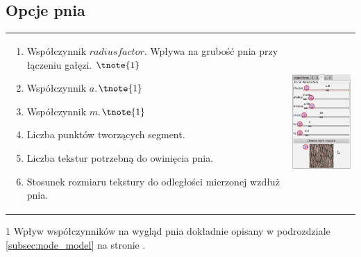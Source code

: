 \subsection{Opcje pnia}
\begin{threeparttable}
\begin{tabular}{lr}
\parbox[c]{95mm}{
\begin{enumerate}
	\item {Współczynnik $radius factor$. Wpływa na grubość pnia przy łączeniu gałęzi. $\tnote{1}$}
	\item {Współczynnik $a$.$\tnote{1}$}
	\item {Współczynnik $m$.$\tnote{1}$}
	\item {Liczba punktów tworzących segment.}
	\item {Liczba tekstur potrzebną do owinięcia pnia.}
	\item {Stosunek rozmiaru tekstury do odległości mierzonej wzdłuż pnia.}
\end{enumerate}
} &
\parbox[c]{35mm}{
\includegraphics[width=35mm]{images/gui/trunk_panel.png}
}\\
\end{tabular}
\begin{tablenotes}
	\item[1] Wpływ współczynników na wygląd pnia dokładnie opisany w podrozdziale \ref{subsec:node_model} na stronie \pageref{subsec:node_model}.
\end{tablenotes}

\end{threeparttable}


